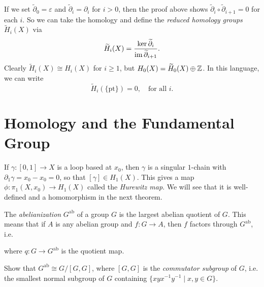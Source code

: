 \begin{remark}
  If we set $\widetilde{\partial}_0 = \varepsilon$
  and $\widetilde{\partial}_i = \partial_i$ for $i > 0$,
  then the proof above shows $\widetilde{\partial}_i \circ \widetilde{\partial}_{i + 1} = 0$ for each $i$.
  So we can take the homology and
  define the \emph{reduced homology groups}
  $\widetilde{H}_i(X)$ via
  \[
    \widetilde{H}_i(X) = \frac{\ker \widetilde{\partial}_i}{\operatorname{im} \widetilde{\partial}_{i + 1}}.
  \]
  Clearly $\widetilde{H}_i(X) \cong H_i(X)$ for $i \ge 1$,
  but $H_0(X) = \widetilde{H}_0(X) \oplus \mathbb{Z}$. In this
  language, we can write
  \[
    \widetilde{H}_i(\{\text{pt}\}) = 0, \quad \text{for all $i$}.
  \]
\end{remark}

\section{Homology and the Fundamental Group}

\begin{remark}
  If $\gamma : [0, 1] \to X$ is a loop based at
  $x_0$, then $\gamma$ is a singular $1$-chain
  with $\partial_1 \gamma = x_0 - x_0 = 0$, so
  that $[\gamma] \in H_1(X)$. This gives a map
  $\phi : \pi_1(X, x_0) \to H_1(X)$
  called the \emph{Hurewitz map}. We will see that it is
  well-defined and a homomorphism in the next theorem.
\end{remark}

\begin{definition}
  The \emph{abelianization} $G^{\mathrm{ab}}$ of a group $G$
  is the largest abelian quotient of $G$. This means
  that if $A$ is any abelian group and
  $f : G \to A$, then $f$ factors through
  $G^{\mathrm{ab}}$, i.e.
  \begin{center}
  \end{center}
  where $q : G \to G^{\mathrm{ab}}$ is the quotient map.
\end{definition}

\begin{exercise}
  Show that $G^{\mathrm{ab}} \cong G / [G, G]$,
  where $[G, G]$ is the \emph{commutator subgroup} of
  $G$, i.e. the smallest normal subgroup of $G$
  containing $\{xyx^{-1}y^{-1} \mid x, y \in G\}$.
\end{exercise}

